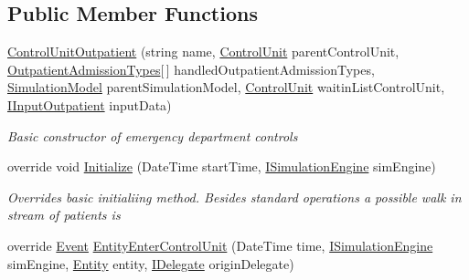 \subsection*{Public Member Functions}
\begin{DoxyCompactItemize}
\item 
\hyperlink{class_general_health_care_elements_1_1_department_models_1_1_outpatient_1_1_control_unit_outpatient_abcd0a2e9d6ad1aae9f07ce115a405829}{Control\+Unit\+Outpatient} (string name, \hyperlink{class_simulation_core_1_1_h_c_c_m_elements_1_1_control_unit}{Control\+Unit} parent\+Control\+Unit, \hyperlink{class_general_health_care_elements_1_1_treatment_admission_types_1_1_outpatient_admission_types}{Outpatient\+Admission\+Types}\mbox{[}$\,$\mbox{]} handled\+Outpatient\+Admission\+Types, \hyperlink{class_simulation_core_1_1_simulation_classes_1_1_simulation_model}{Simulation\+Model} parent\+Simulation\+Model, \hyperlink{class_simulation_core_1_1_h_c_c_m_elements_1_1_control_unit}{Control\+Unit} waitin\+List\+Control\+Unit, \hyperlink{interface_general_health_care_elements_1_1_department_models_1_1_outpatient_1_1_i_input_outpatient}{I\+Input\+Outpatient} input\+Data)
\begin{DoxyCompactList}\small\item\em Basic constructor of emergency department controls \end{DoxyCompactList}\item 
override void \hyperlink{class_general_health_care_elements_1_1_department_models_1_1_outpatient_1_1_control_unit_outpatient_a4232d88f125b3c9480b48ff620ef019e}{Initialize} (Date\+Time start\+Time, \hyperlink{interface_simulation_core_1_1_simulation_classes_1_1_i_simulation_engine}{I\+Simulation\+Engine} sim\+Engine)
\begin{DoxyCompactList}\small\item\em Overrides basic initialiing method. Besides standard operations a possible walk in stream of patients is \end{DoxyCompactList}\item 
override \hyperlink{class_simulation_core_1_1_h_c_c_m_elements_1_1_event}{Event} \hyperlink{class_general_health_care_elements_1_1_department_models_1_1_outpatient_1_1_control_unit_outpatient_a6ef7dd97ce9a8a13328e89fc0e40200e}{Entity\+Enter\+Control\+Unit} (Date\+Time time, \hyperlink{interface_simulation_core_1_1_simulation_classes_1_1_i_simulation_engine}{I\+Simulation\+Engine} sim\+Engine, \hyperlink{class_simulation_core_1_1_h_c_c_m_elements_1_1_entity}{Entity} entity, \hyperlink{interface_simulation_core_1_1_h_c_c_m_elements_1_1_i_delegate}{I\+Delegate} origin\+Delegate)

\end{DoxyCompactItemize}
